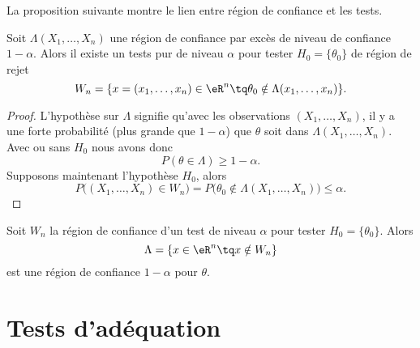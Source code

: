 La proposition suivante montre le lien entre région de confiance et les tests.
\begin{proposition}
    Soit \( \Lambda(X_1,\ldots, X_n)\) une région de confiance par excès de niveau de confiance \( 1-\alpha\). Alors il existe un tests pur de niveau \( \alpha\) pour tester \( H_0=\{ \theta_0 \}\) de région de rejet
    \begin{equation}
        W_n=\{ x=(x_1,\ldots,x_n)\in \eR^n\tq \theta_0\notin\Lambda(x_1,\ldots,x_n) \}.
    \end{equation}
\end{proposition}

\begin{proof}
    L'hypothèse sur \( \Lambda\) signifie qu'avec les observations \( (X_1,\ldots, X_n)\), il y a une forte probabilité (plus grande que \( 1-\alpha\)) que \( \theta\) soit dans \( \Lambda(X_1,\ldots, X_n)\). Avec ou sans \( H_0\) nous avons donc
    \begin{equation}
        P(\theta\in\Lambda)\geq 1-\alpha.
    \end{equation}
    Supposons maintenant l'hypothèse \( H_0\), alors
    \begin{equation}
        P\big( (X_1,\ldots, X_n)\in W_n \big)=P\big( \theta_0\notin\Lambda(X_1,\ldots, X_n) \big)\leq \alpha.
    \end{equation}
\end{proof}

\begin{remark}
    Soit \( W_n\) la région de confiance d'un test de niveau \( \alpha\) pour tester \( H_0=\{ \theta_0 \}\). Alors
    \begin{equation}
        \Lambda=\{ x\in\eR^n\tq x\notin W_n \} 
    \end{equation}
    est une région de confiance \( 1-\alpha\) pour \( \theta\).
\end{remark}


\section{Tests d'adéquation}

